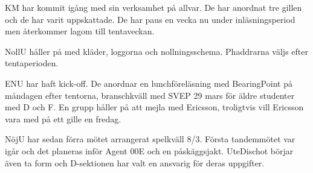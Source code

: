 \documentclass[10pt]{article}
\begin{document}
\begin{paragrafer}
\begin{paragrafer}
KM har kommit igång med sin verksamhet på allvar. De har anordnat tre gillen och de har varit uppskattade. De har paus en vecka nu under inläsningsperiod men återkommer lagom till tentaveckan.

NollU håller på med kläder, loggorna och nollningsschema. Phaddrarna väljs efter tentaperioden.

ENU har haft kick-off. De anordnar en lunchföreläsning med BearingPoint på måndagen efter tentorna, branschkväll med SVEP 29 mars för äldre studenter med D och F. En grupp håller på att mejla med Ericsson, troligtvis vill Ericsson vara med på ett gille en fredag.

NöjU har sedan förra mötet arrangerat spelkväll 8/3. Första tandemmötet var igår och det planeras inför Agent 00E och en påskäggsjakt. UteDischot börjar även ta form och D-sektionen har valt en ansvarig för deras uppgifter.


\end{paragrafer}
\end{paragrafer}
\end{document}
